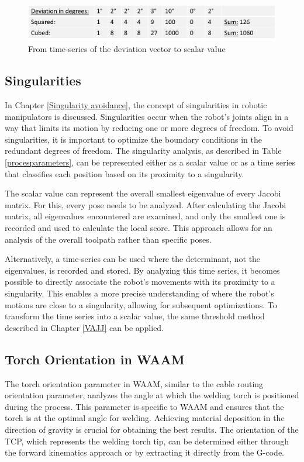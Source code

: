 \begin{figure}[H]
	\centerline{\includegraphics[width=.9\textwidth]{figures/devi.png}}
	\caption{From time-series of the deviation vector to scalar value}
	\label{deviation}
\end{figure}
 

\subsection{Singularities}

In Chapter \ref{Singularity avoidance}, the concept of singularities in robotic manipulators is discussed. Singularities occur when the robot's joints align in a way that limits its motion by reducing one or more degrees of freedom. To avoid singularities, it is important to optimize the boundary conditions in the redundant degrees of freedom. The singularity analysis, as described in Table \ref{procesparameters}, can be represented either as a scalar value or as a time series that classifies each position based on its proximity to a singularity.

The scalar value can represent the overall smallest eigenvalue of every Jacobi matrix. For this, every pose needs to be analyzed. After calculating the Jacobi matrix, all eigenvalues encountered are examined, and only the smallest one is recorded and used to calculate the local score. This approach allows for an analysis of the overall toolpath rather than specific poses.

Alternatively, a time-series can be used where the determinant, not the eigenvalues, is recorded and stored. By analyzing this time series, it becomes possible to directly associate the robot's movements with its proximity to a singularity. This enables a more precise understanding of where the robot's motions are close to a singularity, allowing for subsequent optimizations. To transform the time series into a scalar value, the same threshold method described in Chapter \ref{VAJJ} can be applied.
  
  

\subsection{Torch Orientation in WAAM}
The torch orientation parameter in WAAM, similar to the cable routing orientation parameter, analyzes the angle at which the welding torch is positioned during the process. This parameter is specific to WAAM and ensures that the torch is at the optimal angle for welding. Achieving material deposition in the direction of gravity is crucial for obtaining the best results. The orientation of the TCP, which represents the welding torch tip, can be determined either through the forward kinematics approach or by extracting it directly from the G-code.

